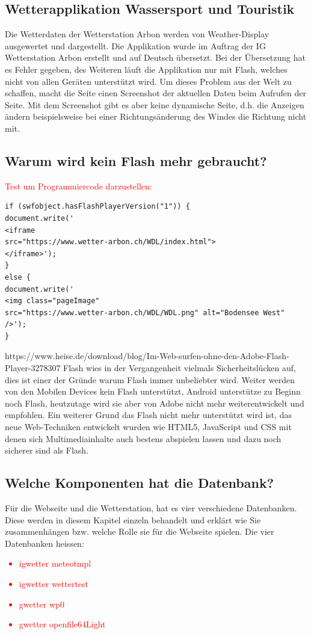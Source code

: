 \documentclass[a4paper,ngerman, 11pt]{report}
\newcommand\Diskussionspunkt[1]{\textcolor{red}{#1}}
\begin{document}
\subsection{Wetterapplikation Wassersport und Touristik}
Die Wetterdaten der Wetterstation Arbon werden von Weather-Display ausgewertet und dargestellt. Die Applikation wurde im Auftrag der IG Wetterstation Arbon erstellt und auf Deutsch übersetzt. Bei der Übersetzung hat es Fehler gegeben, des Weiteren läuft die Applikation nur mit Flash, welches nicht von allen Geräten unterstützt wird. Um dieses Problem aus der Welt zu schaffen, macht die Seite einen Screenshot der aktuellen Daten beim Aufrufen der Seite. Mit dem Screenshot gibt es aber keine dynamische Seite, d.h. die Anzeigen ändern beispielsweise bei einer Richtungsänderung des Windes die Richtung nicht mit. 

\subsection{Warum wird kein Flash mehr gebraucht?}

\Diskussionspunkt{Test um Programmiercode darzustellen:}
\begin{lstlisting}
if (swfobject.hasFlashPlayerVersion("1")) {
document.write('
<iframe 
src="https://www.wetter-arbon.ch/WDL/index.html">
</iframe>');
} 
else {
document.write('
<img class="pageImage" 
src="https://www.wetter-arbon.ch/WDL/WDL.png" alt="Bodensee West" 
/>');
}
\end{lstlisting}
  
https://www.heise.de/download/blog/Im-Web-surfen-ohne-den-Adobe-Flash-Player-3278307
Flash wies in der Vergangenheit vielmals Sicherheitslücken auf, dies ist einer der Gründe warum Flash immer unbeliebter wird. Weiter werden von den Mobilen Devices kein Flash unterstützt, Android unterstütze zu Beginn noch Flash, heutzutage wird sie aber von Adobe nicht mehr weiterentwickelt und empfohlen. Ein weiterer Grund das Flash nicht mehr unterstützt wird ist, das neue Web-Techniken entwickelt wurden wie HTML5, JavaScript und CSS mit denen sich Multimediainhalte auch bestens abspielen lassen und dazu noch sicherer sind als Flash.

\subsection{Welche Komponenten hat die Datenbank?}
Für die Webseite und die Wetterstation, hat es vier verschiedene Datenbanken. Diese werden in diesem Kapitel einzeln behandelt und erklärt wie Sie zusammenhängen bzw. welche Rolle sie für die Webseite spielen. Die vier Datenbanken heissen:
\Diskussionspunkt{
\begin{itemize}  
\item igwetter meteotmpl
\item igwetter wettertest
\item gwetter wp0
\item gwetter openfile64Light
\end{itemize}
}
\end{document}
